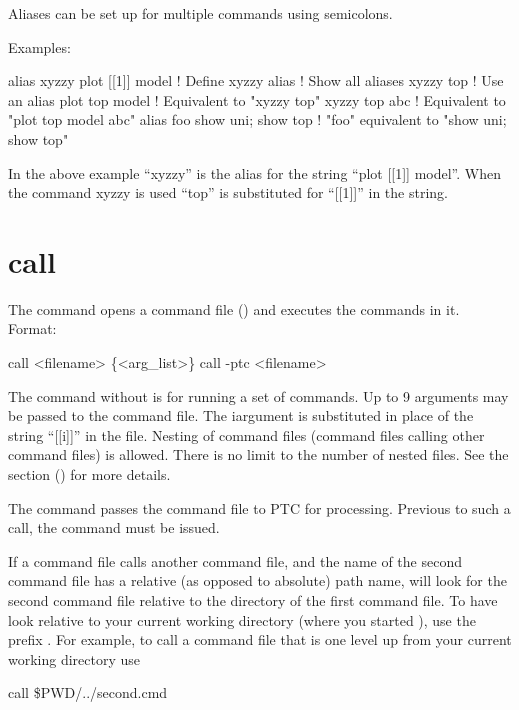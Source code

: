 Aliases can be set up for multiple commands using semicolons.

Examples:
\begin{example}
  alias xyzzy plot [[1]] model  ! Define xyzzy
  alias                         ! Show all aliases
  xyzzy top                     ! Use an alias
  plot top model                ! Equivalent to "xyzzy top"
  xyzzy top abc                 ! Equivalent to "plot top model abc"
  alias foo  show uni; show top ! "foo" equivalent to "show uni; show top"
\end{example}
In the above example ``xyzzy'' is the alias for the string ``plot [[1]] model''.  When the
command xyzzy is used ``top'' is substituted for ``[[1]]'' in the string.

\section{call}
\label{s:call}

The  command opens a command file () and executes the
commands in it. Format:
\vskip 1pt 
\begin{example}
  call <filename> \{<arg_list>\}
  call -ptc <filename>
\end{example}

\vskip 1pt 
The  command without  is for running a set of \tao commands.  Up to 9
arguments may be passed to the command file. The i\Th argument is substituted in place of
the string ``[[i]]'' in the file. Nesting of command files (command files calling other
command files) is allowed. There is no limit to the number of nested files.  See the
 section () for more details.

The  command passes the command file to PTC for processing. Previous to such
a call, the command  must be issued.

If a command file calls another command file, and the name of the second command file has a relative
(as opposed to absolute) path name, \tao will look for the second command file relative to the
directory of the first command file. To have \tao look relative to your current working directory
(where you started \tao), use the prefix . For example, to call a command file that is
one level up from your current working directory use
\begin{example}
  call \$PWD/../second.cmd
\end{example}


